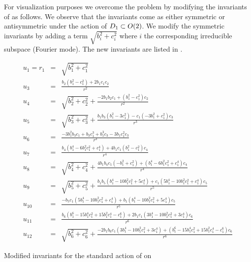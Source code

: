 For visualization purposes we overcome the problem by modifying
the invariants of  as follows. We observe
that the invariants come as either symmetric or antisymmetric
under the action of $D_{1}\subset O(2)$. We modify the
symmetric invariants by adding a term $\sqrt{b_i^2+c_i^2}$
where $i$ the corresponding irreducible subspace  (Fourier
mode). The new invariants are listed in
.

\begin{table}
\begin{small}
\begin{eqnarray*}
  u_1=r_1 &=&\sqrt{b_1^2+c_1^2}\\
  u_3 &=&\frac{b_2 \left(b_1^2-c_1^2\right)+2 b_1 c_1 c_2}{r^2}\\
  u_4 &=&\sqrt{b_2^2+c_2^2}+\frac{-2
b_1 b_2 c_1+\left(b_1^2-c_1^2\right) c_2}{r^2}\\
  u_5 &=&\sqrt{b_3^2+c_3^2}+\frac{b_1 b_3 \left(b_1^2-3 c_1^2\right)-c_1 \left(-3
b_1^2+c_1^2\right) c_3}{r^3}\\
  u_6 &=&\frac{-3 b_1^2 b_3 c_1+b_3 c_1^3+b_1^3 c_3-3 b_1 c_1^2 c_3}{r^3}\\
  u_7 &=&\frac{b_4
\left(b_1^4-6 b_1^2 c_1^2+c_1^4\right)+4 b_1 c_1 \left(b_1^2-c_1^2\right) c_4}{r^4}\\
  u_8 &=&\sqrt{b_4^2+c_4^2}+\frac{4 b_1
b_4 c_1 \left(-b_1^2+c_1^2\right)+\left(b_1^4-6 b_1^2 c_1^2+c_1^4\right) c_4}{r^4}\\
  u_9 &=&\sqrt{b_5^2+c_5^2}+\frac{b_1
b_5 \left(b_1^4-10 b_1^2 c_1^2+5 c_1^4\right)+c_1 \left(5 b_1^4-10 b_1^2 c_1^2+c_1^4\right) c_5}{r^5}\\
  u_{10} &=&\frac{-b_5
c_1 \left(5 b_1^4-10 b_1^2 c_1^2+c_1^4\right)+b_1 \left(b_1^4-10 b_1^2 c_1^2+5 c_1^4\right) c_5}{r^5}\\
  u_{11} &=&\frac{b_6
\left(b_1^6-15 b_1^4 c_1^2+15 b_1^2 c_1^4-c_1^6\right)+2 b_1 c_1 \left(3 b_1^4-10 b_1^2 c_1^2+3 c_1^4\right) c_6}{r^6} \\
  u_{12} &=&\sqrt{b_6^2+c_6^2}+\frac{-2
b_1 b_6 c_1 \left(3 b_1^4-10 b_1^2 c_1^2+3 c_1^4\right)+\left(b_1^6-15 b_1^4 c_1^2+15 b_1^2 c_1^4-c_1^6\right) c_6}{r^6}
\end{eqnarray*}
\caption[Modified invariants for $\SOn{2}, n=6$]
{Modified invariants for the standard action of  on }
\label{tab:SO2n6modif}
\end{small}
\end{table}

